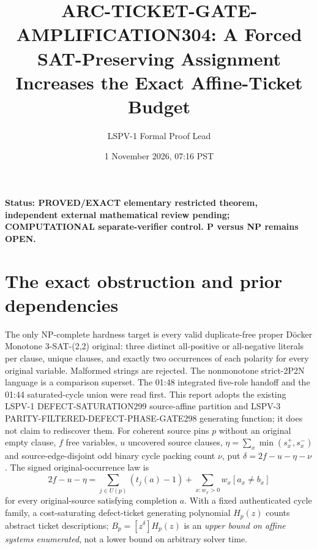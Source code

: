 \documentclass[11pt]{article}
\title{ARC-TICKET-GATE-AMPLIFICATION304: A Forced SAT-Preserving Assignment Increases the Exact Affine-Ticket Budget}
\author{LSPV-1 Formal Proof Lead}
\date{1 November 2026, 07:16 PST}
\begin{document}
\maketitle
\noindent\textbf{Status: PROVED/EXACT elementary restricted theorem, independent external mathematical review pending; COMPUTATIONAL separate-verifier control. P versus NP remains OPEN.}
\section{The exact obstruction and prior dependencies}
The only NP-complete hardness target is every valid duplicate-free proper D\"ocker Monotone 3-SAT-(2,2) original: three distinct all-positive or all-negative literals per clause, unique clauses, and exactly two occurrences of each polarity for every original variable. Malformed strings are rejected. The nonmonotone strict-2P2N language is a comparison superset. The 01:48 integrated five-role handoff and the 01:44 saturated-cycle union were read first. This report adopts the existing LSPV-1 DEFECT-SATURATION299 source-affine partition and LSPV-3 PARITY-FILTERED-DEFECT-PHASE-GATE298 generating function; it does not claim to rediscover them.
For coherent source pins $p$ without an original empty clause, $f$ free variables, $u$ uncovered source clauses, $\eta=\sum_x\min(s_x^+,s_x^-)$ and source-edge-disjoint odd binary cycle packing count $\nu$, put $\delta=2f-u-\eta-\nu$. The signed original-occurrence law is
\[
2f-u-\eta=\sum_{j\in U(p)}(t_j(a)-1)+
\sum_{x:w_x>0}w_x[a_x\ne b_x]
\]
for every original-source satisfying completion $a$. With a fixed authenticated cycle family, a cost-saturating defect-ticket generating polynomial $H_p(z)$ counts abstract ticket descriptions; $B_p=[z^\delta]H_p(z)$ is an \emph{upper bound on affine systems enumerated}, not a lower bound on arbitrary solver time.
\end{document}
